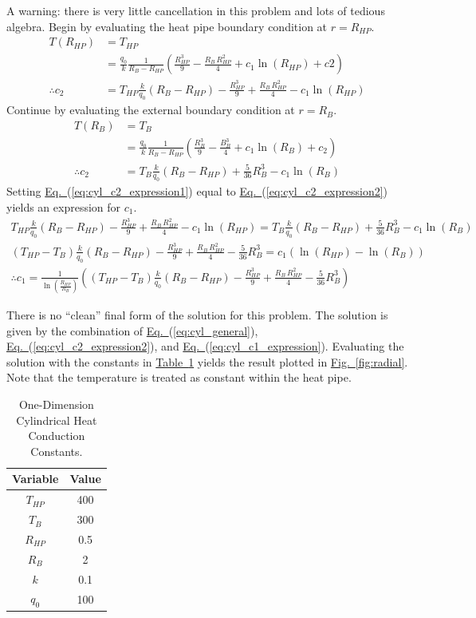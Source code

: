 \documentclass{article}
\newcommand{\eref}[1]{\hyperref[#1]{Eq.~}(\ref{#1})}
\newcommand{\fref}[1]{\hyperref[#1]{Fig.~}\ref{#1}}
\newcommand{\tref}[1]{\hyperref[#1]{Table~}\ref{#1}}
\begin{document}
A warning: there is very little cancellation in this problem and lots of tedious algebra.
Begin by evaluating the heat pipe boundary condition at $r=R_{HP}$.
\begin{align}
  T(R_{HP}) &= T_{HP} \\
  &= \frac{q_0}{k} \frac{1}{R_B - R_{HP}} \left( \frac{R_{HP}^3}{9} - \frac{R_{B} \, R_{HP}^2}{4} + c_1 \ln(R_{HP}) + c2 \right) \\
  \label{eq:cyl_c2_expression1}
  \therefore c_2 &= T_{HP} \frac{k}{q_0} (R_B - R_{HP}) - \frac{R_{HP}^3}{9} + \frac{R_B \, R_{HP}^2}{4} - c_1 \ln(R_{HP})
\end{align}
Continue by evaluating the external boundary condition at $r=R_B$.
\begin{align}
  T(R_B) &= T_B \\
  &= \frac{q_0}{k} \frac{1}{R_B - R_{HP}} \left( \frac{R_B^3}{9} - \frac{B_B^3}{4} + c_1 \ln(R_B) + c_2 \right) \\
  \label{eq:cyl_c2_expression2}
  \therefore c_2 &= T_B \frac{k}{q_0} (R_B - R_{HP}) + \frac{5}{36} R_B^3 - c_1 \ln(R_B)
\end{align}
Setting \eref{eq:cyl_c2_expression1} equal to \eref{eq:cyl_c2_expression2} yields an expression for $c_1$.
\begin{gather}
  T_{HP} \frac{k}{q_0} (R_B - R_{HP}) - \frac{R_{HP}^3}{9} + \frac{R_B \, R_{HP}^2}{4} - c_1 \ln(R_{HP}) = T_B \frac{k}{q_0} (R_B - R_{HP}) + \frac{5}{36} R_B^3 - c_1 \ln(R_B) \\
  (T_{HP} - T_{B}) \frac{k}{q_0} (R_B - R_{HP}) - \frac{R_{HP}^3}{9} + \frac{R_B \, R_{HP}^2}{4} - \frac{5}{36} R_B^3 = c_1 \left( \ln(R_{HP}) - \ln(R_B) \right) \\
  \label{eq:cyl_c1_expression}
  \therefore c_1 = \frac{1}{\ln\left(\frac{R_{HP}}{R_B}\right)} \left( (T_{HP} - T_B) \frac{k}{q_0} (R_B - R_{HP}) - \frac{R_{HP}^3}{9} + \frac{R_B \, R_{HP}^2}{4} - \frac{5}{36} R_B^3 \right)
\end{gather}

There is no ``clean'' final form of the solution for this problem.
The solution is given by the combination of \eref{eq:cyl_general}, \eref{eq:cyl_c2_expression2}, and \eref{eq:cyl_c1_expression}.
Evaluating the solution with the constants in \tref{tab:radial} yields the result plotted in \fref{fig:radial}.
Note that the temperature is treated as constant within the heat pipe.

\begin{table}
  \centering
  \caption{One-Dimension Cylindrical Heat Conduction Constants.}
  \label{tab:radial}
  \begin{tabular}{cc}
    \\
    \toprule
    Variable & Value \\
    \midrule
    $T_{HP}$ & 400 \\
    $T_{B}$  & 300 \\
    $R_{HP}$ & 0.5 \\
    $R_{B}$  & 2   \\
    $k$      & 0.1 \\
    $q_0$    & 100 \\
    \bottomrule
  \end{tabular}
\end{table}
\end{document}

